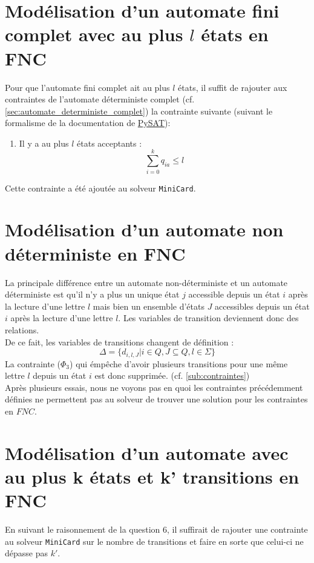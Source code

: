 \documentclass[a4paper, 12pt]{extarticle}
\begin{document}
\section{Modélisation d'un automate fini complet avec au plus $l$ états en FNC}
\noindent Pour que l'automate fini complet ait au plus $l$ états, il suffit de rajouter aux contraintes de l'automate déterministe complet (cf. \ref{sec:automate_deterministe_complet}) 
la contrainte suivante (suivant le formalisme de la documentation de \href{https://pysathq.github.io/docs/html/api/solvers.html#pysat.solvers.Solver.add_atmost}{PySAT}):
\begin{enumerate}
    \item Il y a au plus $l$ états acceptants :
    \begin{equation*}
        \sum_{i=0}^{k} q_{ia} \le l
    \end{equation*}
\end{enumerate}
Cette contrainte a été ajoutée au solveur \texttt{MiniCard}.


\section{Modélisation d'un automate non déterministe en FNC}
\label{sec:non_deterministe}
\noindent La principale différence entre un automate non-déterministe et un automate déterministe est qu'il n'y a plus un unique état $j$ accessible depuis un état $i$
après la lecture d'une lettre $l$ mais bien un ensemble d'états $J$ accessibles depuis un état $i$ après la lecture d'une lettre $l$. Les variables de transition deviennent
donc des relations. \\
De ce fait, les variables de transitions changent de définition :
\begin{equation*}
    \Delta = \{d_{i, l, J} | i\in Q, J\subseteq Q, l \in \Sigma\}
\end{equation*}
La contrainte ($\Phi_3$) qui émpêche d'avoir plusieurs transitions pour une même lettre $l$ depuis un état $i$ est donc supprimée. (cf. \ref{sub:contraintes})\\
Après plusieurs essais, nous ne voyons pas en quoi les contraintes précédemment définies ne permettent pas au solveur de trouver une solution pour les
contraintes en $FNC$.


\section{Modélisation d'un automate avec au plus k états et k' transitions en FNC}
En suivant le raisonnement de la question 6, il suffirait de rajouter une contrainte au solveur \texttt{MiniCard} 
sur le nombre de transitions et faire en sorte que celui-ci ne dépasse pas $k'$.
\end{document}
